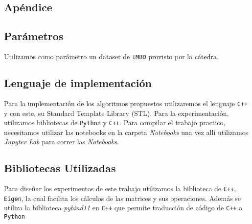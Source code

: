
\subsection{Apéndice}

\subsection{Parámetros}
Utilizamos como parámetro un dataset de \texttt{IMBD} provisto por la cátedra. 

\subsection{Lenguaje de implementación}
Para la implementación de los algoritmos propuestos utilizaremos el lenguaje \texttt{C++} y con este, su Standard Template Library (STL).
Para la experimentación, utilizamos bibliotecas de \texttt{Python} y \texttt{C++}. Para compilar el trabajo practico, necesitamos utilizar las notebooks en la carpeta \textit{Notebooks} una vez alli utilizamos \textit{Jupyter Lab} para correr las \textit{Notebooks}.

\subsection{Bibliotecas Utilizadas}
Para diseñar los experimentos de este trabajo utilizamos la biblioteca de \texttt{C++}, \texttt{Eigen}, la cual facilita los cálculos de las matrices y sus operaciones. 
Además se utiliza la biblioteca \textit{pybind11} en \texttt{C++} que permite traducción de código de \texttt{C++} a \texttt{Python} 
